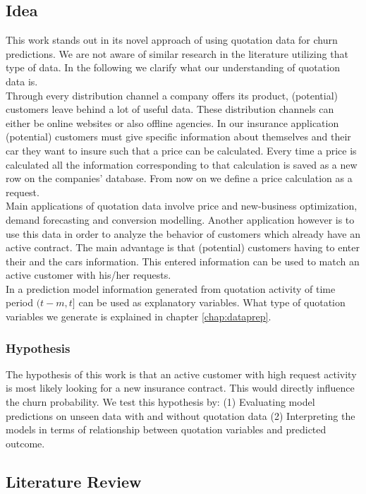 \documentclass[12pt,titlepage]{article}
\begin{document}
\subsection{Idea} \par

This work stands out in its novel approach of using quotation data for churn predictions. We are not aware of similar research in the literature utilizing that type of data. In the following we clarify what our understanding of quotation data is. \\
Through every distribution channel a company offers its product, (potential) customers leave behind a lot of useful data. These distribution channels can either be online websites or also offline agencies. In our insurance application (potential) customers must give specific information about themselves and their car they want to insure such that a price can be calculated. Every time a price is calculated all the information corresponding to that calculation is saved as a new row on the companies' database. From now on we define a price calculation as a request. \\
Main applications of quotation data involve price and new-business optimization, demand forecasting and conversion modelling. Another application however is to use this data in order to analyze the behavior of customers which already have an active contract. The main advantage is that (potential) customers having to enter their and the cars information. This entered information can be used to match an active customer with his/her requests. \\
In a prediction model information generated from quotation activity of time period $(t-m, t]$ can be used as explanatory variables. What type of quotation variables we generate is explained in chapter \ref{chap:dataprep}. \\
\subsubsection*{Hypothesis}
The hypothesis of this work is that an active customer with high request activity is most likely looking for a new insurance contract. This would directly influence the churn probability. We test this hypothesis by: (1) Evaluating model predictions on unseen data with and without quotation data (2) Interpreting the models in terms of relationship between quotation variables and predicted outcome. \\

\subsection{Literature Review} \par
\end{document}

